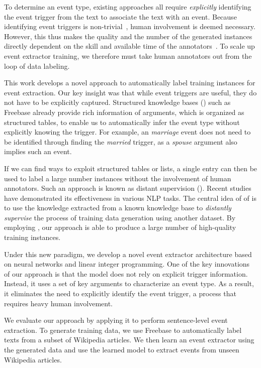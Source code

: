 To determine an event type, existing approaches  all require \emph{explicitly} identifying the event trigger from the text to associate the
text with an event. Because identifying event triggers is non-trivial~\FIXME{\cite{}}, human involvement is deemed necessary. However, this
thus makes the quality and the number of the generated instances directly dependent on the skill and available time of the
annotators~\cite{aguilar2014comparison,song2015light}. To scale up event extractor training, we therefore must take human annotators out
from the loop of data labeling.


This work develops a novel approach to automatically label training instances for event extraction. Our key insight was that while event
triggers are useful, they do not have to be explicitly captured. Structured knowledge bases (\KBs) such as Freebase already provide rich
information of arguments, which is organized as structured tables,  to enable us to automatically infer the event type without explicitly
knowing the trigger. For example, an \emph{marriage} event does not need to be identified through finding the \emph{married} trigger, as a
\emph{spouse} argument also implies
such an event. %


If we can find ways to exploit structured tables or lists, a single entry can then be used to label a large number instances without the
involvement of human annotators. Such an approach is known as distant supervision (\DS). Recent
studies~\cite{mintz2009distant,zeng2015distant} have demonstrated its effectiveness in various NLP tasks. The central idea of of \DS is to
use the knowledge extracted from a known knowledge base to \emph{distantly supervise} the process of training data generation using another
dataset. By employing \DS, our approach is able to produce a large number of high-quality training instances.

Under this new \DS paradigm, we develop a novel event extractor architecture based on neural networks and linear integer programming. One
of the key innovations of our approach is that the model does not rely on explicit trigger information. Instead, it uses a set of key
arguments to characterize an event type. As a result, it eliminates the need to explicitly identify the event trigger, a process that
requires heavy human involvement.

We evaluate our approach by  applying it to perform sentence-level event extraction. To generate training data, we use Freebase to
automatically label texts from a subset of Wikipedia articles. We then learn an event extractor using the generated data and use the
learned model to extract events from unseen Wikipedia articles.

